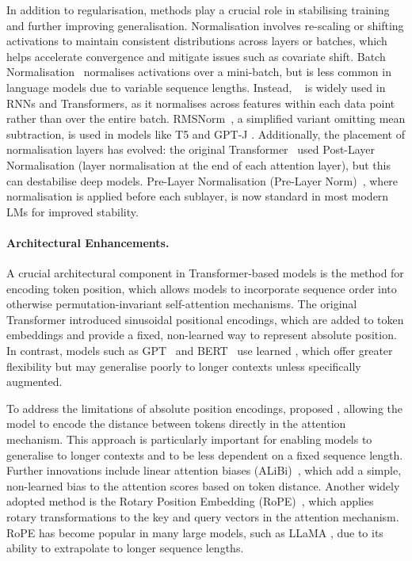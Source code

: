 In addition to regularisation,  methods play a crucial role in stabilising training and further improving generalisation. Normalisation involves re-scaling or shifting activations to maintain consistent distributions across layers or batches, which helps accelerate convergence and mitigate issues such as  covariate shift. Batch Normalisation~\citep{ioffe2015batchnorm} normalises activations over a mini-batch, but is less common in language models due to variable sequence lengths. Instead, ~\citep{ba2016layernorm} is widely used in RNNs and Transformers, as it normalises across features within each data point rather than over the entire batch. RMSNorm~\citep{zhang2019rmsnorm}, a simplified variant omitting mean subtraction, is used in models like T5 \citep{raffel2020t5} and GPT-J \citep{eleutherai2021gptj}. Additionally, the placement of normalisation layers has evolved: the original Transformer~\citep{vaswani2017attention} used Post-Layer Normalisation (layer normalisation at the end of each attention layer), but this can destabilise deep models. Pre-Layer Normalisation (Pre-Layer Norm)~\citep{xiong2020layer}, where normalisation is applied before each sublayer, is now standard in most modern LMs for improved stability.

\paragraph{Architectural Enhancements.}
A crucial architectural component in Transformer-based models is the method for encoding token position, which allows models to incorporate sequence order into otherwise permutation-invariant self-attention mechanisms. The original Transformer \citep{vaswani2017attention} introduced sinusoidal positional encodings, which are added to token embeddings and provide a fixed, non-learned way to represent absolute position. In contrast, models such as GPT~\citep{radford2018gpt1} and BERT~\citep{devlin2019bert} use learned , which offer greater flexibility but may generalise poorly to longer contexts unless specifically augmented.

To address the limitations of absolute position encodings, \citet{shaw2018self} proposed , allowing the model to encode the distance between tokens directly in the attention mechanism. This approach is particularly important for enabling models to generalise to longer contexts and to be less dependent on a fixed sequence length. Further innovations include linear attention biases (ALiBi)~\citep{press2021train}, which add a simple, non-learned bias to the attention scores based on token distance. Another widely adopted method is the Rotary Position Embedding (RoPE)~\citep{su2024rope}, which applies rotary transformations to the key and query vectors in the attention mechanism. RoPE has become popular in many large models, such as LLaMA \citep{touvron2023llama}, due to its ability to extrapolate to longer sequence lengths.

